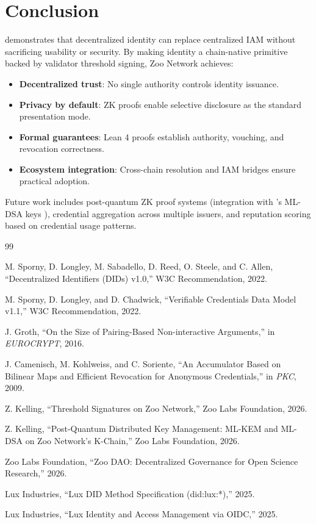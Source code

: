 \section{Conclusion}


\IChain{} demonstrates that decentralized identity can replace centralized IAM without sacrificing usability or security. By making identity a chain-native primitive backed by validator threshold signing, Zoo Network achieves:

\begin{itemize}
\item \textbf{Decentralized trust}: No single authority controls identity issuance.
\item \textbf{Privacy by default}: ZK proofs enable selective disclosure as the standard presentation mode.
\item \textbf{Formal guarantees}: Lean 4 proofs establish authority, vouching, and revocation correctness.
\item \textbf{Ecosystem integration}: Cross-chain resolution and IAM bridges ensure practical adoption.
\end{itemize}

Future work includes post-quantum ZK proof systems (integration with \KChain{}'s ML-DSA keys \cite{zoo-key-management}), credential aggregation across multiple issuers, and reputation scoring based on credential usage patterns.

\begin{thebibliography}{99}

M. Sporny, D. Longley, M. Sabadello, D. Reed, O. Steele, and C. Allen, ``Decentralized Identifiers (DIDs) v1.0,'' W3C Recommendation, 2022.

M. Sporny, D. Longley, and D. Chadwick, ``Verifiable Credentials Data Model v1.1,'' W3C Recommendation, 2022.

J. Groth, ``On the Size of Pairing-Based Non-interactive Arguments,'' in \textit{EUROCRYPT}, 2016.

J. Camenisch, M. Kohlweiss, and C. Soriente, ``An Accumulator Based on Bilinear Maps and Efficient Revocation for Anonymous Credentials,'' in \textit{PKC}, 2009.

Z. Kelling, ``Threshold Signatures on Zoo Network,'' Zoo Labs Foundation, 2026.

Z. Kelling, ``Post-Quantum Distributed Key Management: ML-KEM and ML-DSA on Zoo Network's K-Chain,'' Zoo Labs Foundation, 2026.

Zoo Labs Foundation, ``Zoo DAO: Decentralized Governance for Open Science Research,'' 2026.

Lux Industries, ``Lux DID Method Specification (did:lux:*),'' 2025.

Lux Industries, ``Lux Identity and Access Management via OIDC,'' 2025.

\end{thebibliography}

